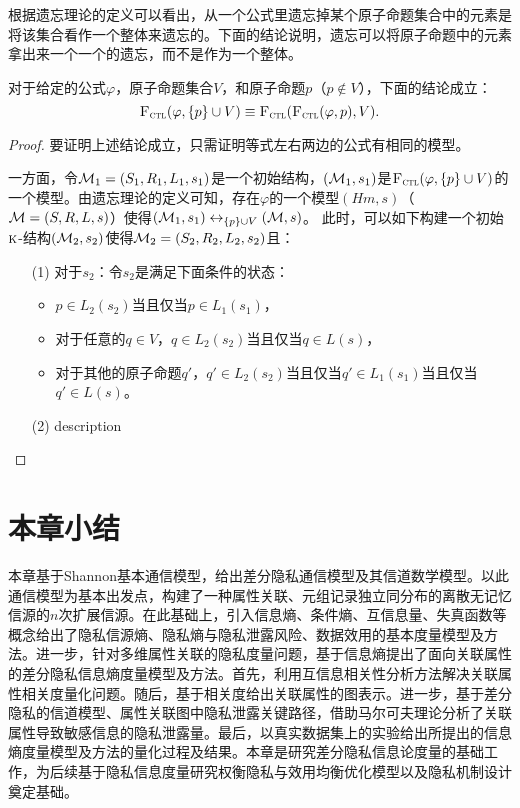 根据遗忘理论的定义可以看出，从一个公式里遗忘掉某个原子命题集合中的元素是将该集合看作一个整体来遗忘的。下面的结论说明，遗忘可以将原子命题中的元素拿出来一个一个的遗忘，而不是作为一个整体。
\begin{proposition}[Modularity]\label{disTF}
	对于给定的公式$\varphi$，原子命题集合$V$，和原子命题$p$（$p\not \in V$），下面的结论成立：
	\[
	{\textsc{F}_{\textsc{ctl}}}(\varphi,\{p\}\cup V) \equiv {\textsc{F}_{\textsc{ctl}}}({\textsc{F}_{\textsc{ctl}}}(\varphi,p),V).
	\]
\end{proposition}
\begin{proof}
	要证明上述结论成立，只需证明等式左右两边的公式有相同的模型。
	
	一方面，令${\cal M}_1=(S_1,R_1,L_1,s_1)$是一个初始结构，$({\cal M}_1,s_1)$是${\textsc{F}_{\textsc{ctl}}}(\varphi,\{p\}\cup V)$的一个模型。由遗忘理论的定义可知，存在$\varphi$的一个模型$(
	Hm,s)$（${\cal M}=(S,R,L,s)$）使得$({\cal M}_1,s_1)\leftrightarrow_{\{p\}\cup V} ({\cal M},s)$。
	此时，可以如下构建一个初始$\textsc{k}$-结构$({\cal M}_2,s_2)$使得${\cal M}_2=(S_2,R_2,L_2,s_2)$且：
	\begin{itemize}
		\item[(1)] 对于$s_2$：令$s_2$是满足下面条件的状态：
		\begin{itemize}
			\item $p \in L_2(s_2)$当且仅当$p\in L_1(s_1)$，
			\item 对于任意的$q \in V$，$q \in L_2(s_2)$当且仅当$q\in L(s)$，
			\item 对于其他的原子命题$q'$，$q' \in L_2(s_2)$当且仅当$q'\in L_1(s_1)$当且仅当$q'\in L(s)$。
		\end{itemize}
			
		\item[(2)] description
	\end{itemize}
\end{proof}

\section{本章小结}
本章基于Shannon基本通信模型，给出差分隐私通信模型及其信道数学模型。以此通信模型为基本出发点，构建了一种属性关联、元组记录独立同分布的离散无记忆信源的$n$次扩展信源。在此基础上，引入信息熵、条件熵、互信息量、失真函数等概念给出了隐私信源熵、隐私熵与隐私泄露风险、数据效用的基本度量模型及方法。进一步，针对多维属性关联的隐私度量问题，基于信息熵提出了面向关联属性的差分隐私信息熵度量模型及方法。首先，利用互信息相关性分析方法解决关联属性相关度量化问题。随后，基于相关度给出关联属性的图表示。进一步，基于差分隐私的信道模型、属性关联图中隐私泄露关键路径，借助马尔可夫理论分析了关联属性导致敏感信息的隐私泄露量。最后，以真实数据集上的实验给出所提出的信息熵度量模型及方法的量化过程及结果。本章是研究差分隐私信息论度量的基础工作，为后续基于隐私信息度量研究权衡隐私与效用均衡优化模型以及隐私机制设计奠定基础。

